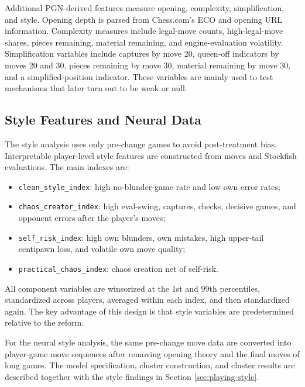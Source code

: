 Additional PGN-derived features measure opening, complexity, simplification, and style. Opening depth is parsed from Chess.com's ECO and opening URL information. Complexity measures include legal-move counts, high-legal-move shares, pieces remaining, material remaining, and engine-evaluation volatility. Simplification variables include captures by move 20, queen-off indicators by moves 20 and 30, pieces remaining by move 30, material remaining by move 30, and a simplified-position indicator. These variables are mainly used to test mechanisms that later turn out to be weak or null.

\subsection{Style Features and Neural Data}

The style analysis uses only pre-change games to avoid post-treatment bias. Interpretable player-level style features are constructed from moves and Stockfish evaluations. The main indexes are:

\begin{itemize}
    \item \texttt{clean\_style\_index}: high no-blunder-game rate and low own error rates;
    \item \texttt{chaos\_creator\_index}: high eval-swing, captures, checks, decisive games, and opponent errors after the player's moves;
    \item \texttt{self\_risk\_index}: high own blunders, own mistakes, high upper-tail centipawn loss, and volatile own move quality;
    \item \texttt{practical\_chaos\_index}: chaos creation net of self-risk.
\end{itemize}

All component variables are winsorized at the 1st and 99th percentiles, standardized across players, averaged within each index, and then standardized again. The key advantage of this design is that style variables are predetermined relative to the reform.

For the neural style analysis, the same pre-change move data are converted into player-game move sequences after removing opening theory and the final moves of long games. The model specification, cluster construction, and cluster results are described together with the style findings in Section \ref{sec:playing-style}.
